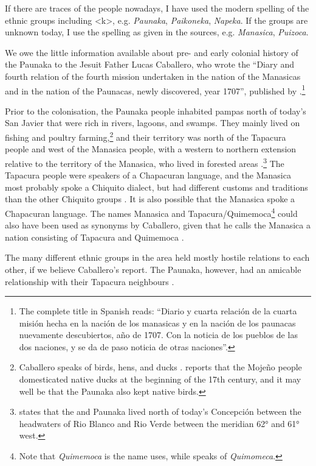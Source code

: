 If there are traces of the people nowadays, I have used the modern spelling of the ethnic groups including <k>, e.g. \textit{Paunaka}, \textit{Paikoneka}, \textit{Napeka}. If the groups are unknown today, I use the spelling as given in the sources, e.g. \textit{Manasica}, \textit{Puizoca}.

We owe the little information available about pre- and early colonial history of the Paunaka to the Jesuit Father Lucas Caballero, who wrote the “Diary and fourth relation of the fourth mission undertaken in the nation of the Manasicas and in the nation of the Paunacas, newly discovered, year 1707”, published by \citet[]{MatienzoAL2011}.\footnote{The complete title in Spanish reads: “Diario y cuarta relación de la cuarta misión hecha en la nación de los manasicas y en la nación de los paunacas nuevamente descubiertos, año de 1707. Con la noticia de los pueblos de las dos naciones, y se da de paso noticia de otras naciones”.}

Prior to the colonisation, the Paunaka people inhabited pampas north of today's San Javier that were rich in rivers, lagoons, and swamps. They mainly lived on fishing and poultry farming,\footnote{Caballero speaks of birds, hens, and ducks \citep[55]{Matienzo_et_al2011}. \citet[62]{Metraux1942} reports that the Mojeño people domesticated native ducks at the beginning of the 17th century, and it may well be that the Paunaka also kept native birds.} and their territory was north of the Tapacura people and west of the Manasica people, with a western to northern extension relative to the territory of the Manasica, who lived in forested areas \citep[54--56]{Matienzo_et_al2011}.\footnote{\citet[134]{Metraux1942} states that the  and Paunaka lived north of today's Concepción between the headwaters of Rio Blanco and Rio Verde between the meridian 62° and 61° west.} The Tapacura people were speakers of a Chapacuran language, and the Manasica most probably spoke a Chiquito dialect, but had different customs and traditions than the other Chiquito groups \citep[250]{TomichaCharupa2002}. It is also possible that the Manasica spoke a Chapacuran language. The names Manasica and Tapacura/Quimemoca\footnote{Note that \textit{Quimemoca} is the name \citet[]{Metraux1942} uses, while \citet[]{Matienzo_et_al2011} speaks of \textit{Quimomeca}.} could also have been used as synonyms by Caballero, given that he calls the Manasica a nation consisting of Tapacura and Quimemoca \citep[127]{Metraux1942}.

The many different ethnic groups in the area held mostly hostile relations to each other, if we believe Caballero’s report. The Paunaka, however, had an amicable relationship with their Tapacura neighbours \citep[55]{Matienzo_et_al2011}.

